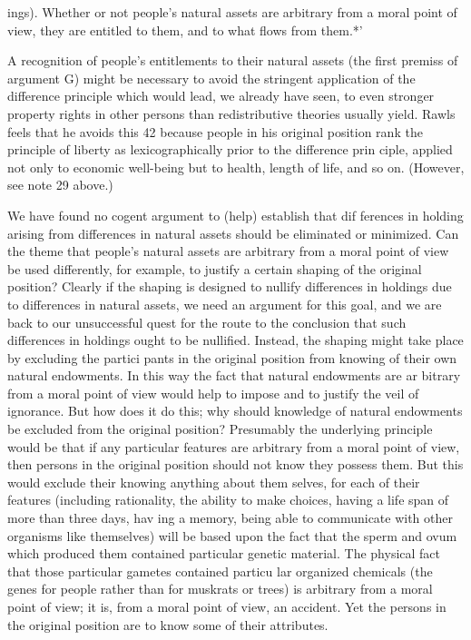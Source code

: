 \documentclass[11pt,openany]{book}
\begin{document}
ings). Whether or not people's natural assets are arbitrary from a moral point of view, they are entitled to them, and to what flows from them.*' 

A recognition of people's entitlements to their natural assets (the first premiss of argument G) might be necessary to avoid the stringent application of the difference principle which would lead, we already have seen, to even stronger property rights in other persons than redistributive theories usually yield. Rawls feels that he avoids this 42 because people in his original position rank the principle of liberty as lexicographically prior to the difference prin ciple, applied not only to economic well-being but to health, length of life, and so on. (However, see note 29 above.) 

We have found no cogent argument to (help) establish that dif ferences in holding arising from differences in natural assets should be eliminated or minimized. Can the theme that people's natural assets are arbitrary from a moral point of view be used differently, for example, to justify a certain shaping of the original position? Clearly if the shaping is designed to nullify differences in holdings due to differences in natural assets, we need an argument for this goal, and we are back to our unsuccessful quest for the route to the conclusion that such differences in holdings ought to be nullified. Instead, the shaping might take place by excluding the partici pants in the original position from knowing of their own natural endowments. In this way the fact that natural endowments are ar bitrary from a moral point of view would help to impose and to justify the veil of ignorance. But how does it do this; why should knowledge of natural endowments be excluded from the original position? Presumably the underlying principle would be that if any particular features are arbitrary from a moral point of view, then persons in the original position should not know they possess them. But this would exclude their knowing anything about them selves, for each of their features (including rationality, the ability to make choices, having a life span of more than three days, hav ing a memory, being able to communicate with other organisms like themselves) will be based upon the fact that the sperm and ovum which produced them contained particular genetic material. The physical fact that those particular gametes contained particu lar organized chemicals (the genes for people rather than for muskrats or trees) is arbitrary from a moral point of view; it is, from a moral point of view, an accident. Yet the persons in the original position are to know some of their attributes. 
\end{document}
